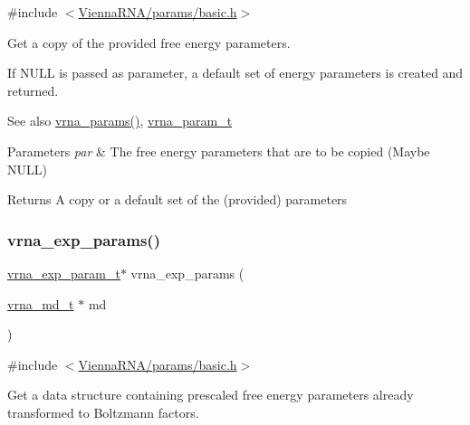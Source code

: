 {\ttfamily \#include $<$\mbox{\hyperlink{params_2basic_8h}{Vienna\+R\+N\+A/params/basic.\+h}}$>$}



Get a copy of the provided free energy parameters. 

If N\+U\+LL is passed as parameter, a default set of energy parameters is created and returned.

\begin{DoxySeeAlso}{See also}
\mbox{\hyperlink{group__energy__parameters_gad0e3e7e74bdc50d1709d40c92993185e}{vrna\+\_\+params()}}, \mbox{\hyperlink{group__energy__parameters_ga8a69ca7d787e4fd6079914f5343a1f35}{vrna\+\_\+param\+\_\+t}}
\end{DoxySeeAlso}

\begin{DoxyParams}{Parameters}
{\em par} & The free energy parameters that are to be copied (Maybe N\+U\+LL) \\
\hline
\end{DoxyParams}
\begin{DoxyReturn}{Returns}
A copy or a default set of the (provided) parameters 
\end{DoxyReturn}
\mbox{\label{group__energy__parameters_gab1f3016f96aa96bff020cdd904605afa}} 
\subsubsection{\texorpdfstring{vrna\_exp\_params()}{vrna\_exp\_params()}}
{\footnotesize\ttfamily \mbox{\hyperlink{group__energy__parameters_ga01d8b92fe734df8d79a6169482c7d8d8}{vrna\+\_\+exp\+\_\+param\+\_\+t}}$\ast$ vrna\+\_\+exp\+\_\+params (\begin{DoxyParamCaption}\item[{\mbox{\hyperlink{group__model__details_ga1f8a10e12a0a1915f2a4eff0b28ea17c}{vrna\+\_\+md\+\_\+t}} $\ast$}]{md }\end{DoxyParamCaption})}



{\ttfamily \#include $<$\mbox{\hyperlink{params_2basic_8h}{Vienna\+R\+N\+A/params/basic.\+h}}$>$}



Get a data structure containing prescaled free energy parameters already transformed to Boltzmann factors. 

